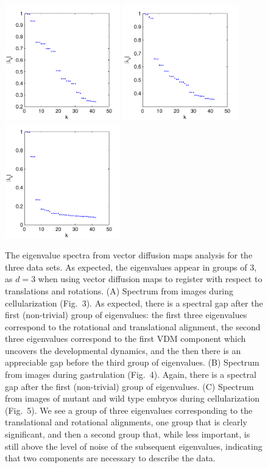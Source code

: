 \documentclass{pnastwo}
\newcommand{\fig}[0]{Fig.}
\begin{document}
\begin{figure}
\includegraphics[width=5cm]{data1_evals}
\includegraphics[width=5cm]{data2_evals}
\includegraphics[width=5cm]{data3_evals}

\caption{The eigenvalue spectra from vector diffusion maps analysis for the three data sets. 
%
As expected, the eigenvalues appear in groups of 3, as $d=3$ when using vector diffusion maps to register with respect to translations and rotations. 
%
(A) Spectrum from images during cellularization (\fig~3). As expected, there is a spectral gap after the first (non-trivial) group of eigenvalues: the first three eigenvalues correspond to the rotational and translational alignment, the second three eigenvalues correspond to the first VDM component which uncovers the developmental dynamics, and the then there is an appreciable gap before the third group of eigenvalues.
%
(B) Spectrum from images during gastrulation (\fig~4). Again, 
there is a spectral gap after the first (non-trivial) group of eigenvalues.
%
(C) Spectrum from images of mutant and wild type embryos during cellularization (\fig~5).
We see a group of three eigenvalues corresponding to the translational and rotational alignments, one group that is clearly significant, and then a second group that, while less important, is still above the level of noise of the subsequent eigenvalues, indicating that two components are necessary to describe the data. }
\label{fig:eval_spectra}
\end{figure}
\end{document}
